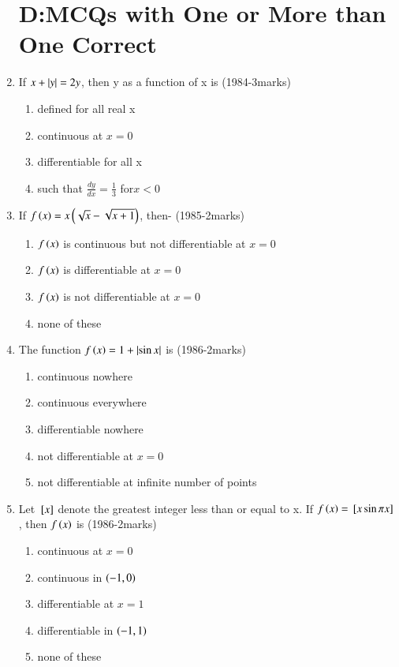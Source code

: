 \documentclass[journal]{IEEEtran}
\numberwithin{equation}{enumi}
\numberwithin{figure}{enumi}
\begin{document}
\begin{enumerate}
\section{D:MCQs with One or More than One Correct}
	\item If $x+\left\vert y\right\vert=2y$, then y as a function of x is \hfill{(1984-3marks)}
		\begin{enumerate}
			\item defined for all real x
			\item continuous at $x=0$
			\item differentiable for all x
			\item such that $\frac{dy}{dx}=\frac{1}{3}$ for$x<0$ 
		\end{enumerate}
	\item If $f\left(x\right)=x\left(\sqrt{x}-\sqrt{x+1}\right)$, then- \hfill{(1985-2marks)}
		\begin{enumerate}
			\item $f\left(x\right)$ is continuous but not differentiable at $x=0$
			\item $f\left(x\right)$ is differentiable at $x=0$
			\item $f\left(x\right)$ is not differentiable at $x=0$
			\item none of these 
		\end{enumerate}
	\item The function $f\left(x\right)=1+\left\vert\sin{x}\right\vert$ is \hfill{(1986-2marks)}
		\begin{enumerate}
			\item continuous nowhere
			\item continuous everywhere
			\item differentiable nowhere 
			\item not differentiable at $x=0$
			\item not differentiable at infinite number of points 
		\end{enumerate}
	\item Let ${}\left[x\right]$ denote the greatest integer less than or equal to x. If $f\left(x\right)={}\left[x\sin{\pi x}\right]$, then $f\left(x\right)$ is \hfill{(1986-2marks)}
		\begin{enumerate}
			\item continuous at $x=0$
			\item continuous in $\left(-1,0\right)$
			\item differentiable at $x=1$ 
			\item differentiable in $\left(-1,1\right)$ 
			\item none of these 

\end{enumerate}
\end{enumerate}
\end{document}
